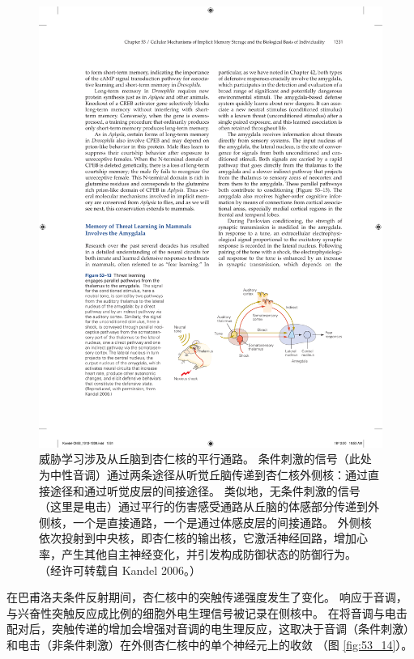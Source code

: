 \begin{figure}[htbp]
	\centering
	\includegraphics[width=0.7\linewidth]{chap53/fig_53_13}
	\caption{威胁学习涉及从丘脑到杏仁核的平行通路。 条件刺激的信号（此处为中性音调）通过两条途径从听觉丘脑传递到杏仁核外侧核：通过直接途径和通过听觉皮层的间接途径。 类似地，无条件刺激的信号（这里是电击）通过平行的伤害感受通路从丘脑的体感部分传递到外侧核，一个是直接通路，一个是通过体感皮层的间接通路。 外侧核依次投射到中央核，即杏仁核的输出核，它激活神经回路，增加心率，产生其他自主神经变化，并引发构成防御状态的防御行为。 （经许可转载自 Kandel 2006。）}
	\label{fig:53_13}
\end{figure}


在巴甫洛夫条件反射期间，杏仁核中的突触传递强度发生了变化。
响应于音调，与兴奋性突触反应成比例的细胞外电生理信号被记录在侧核中。
在将音调与电击配对后，突触传递的增加会增强对音调的电生理反应，这取决于音调（条件刺激）和电击（非条件刺激）在外侧杏仁核中的单个神经元上的收敛 （图 \ref{fig:53_14}）。


